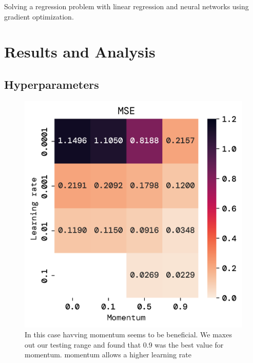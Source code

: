 \documentclass[twoside,11pt]{report}
\begin{document}
    Solving a regression problem with linear regression and neural networks using gradient optimization.



\section*{Results and Analysis}
\label{sec:resultsdiscussion2}




\subsection*{Hyperparameters}
\label{sec:hyperparameters2}


    \begin{figure}[!ht]
        \begin{minipage}[t]{0.5\textwidth - 1mm}
            \begin{center}
                \includegraphics[width=\textwidth]{../runsAndFigures/MSE_lr_gamma.png}
            \end{center}
            \caption{In this case havving momentum seems to be beneficial. 
            We maxes out our testing range and found that 0.9 was the best value for momentum. 
            momentum allows a higher learning rate}\label{fig:MSE_lr_gamma}

\end{minipage}
\end{figure}
\end{document}
